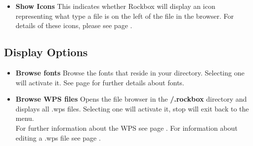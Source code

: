 \begin{itemize}
\begin{itemize}
\item \textbf{Show Icons}
  This indicates whether Rockbox will display an icon representing what type a file is on the left of the file in the browser.  For details of these icons, please see page \pageref{ref:Supportedfileformats}.
\end{itemize}

\subsection{\label{ref:Displayoptions}Display Options}

\begin{itemize}
\item \textbf{Browse fonts}
  Browse the fonts that reside in your  directory. Selecting one will activate it.  See page \pageref{ref:Loadingfonts} for further details about fonts.
  
\item \textbf{Browse WPS files}
  Opens the file browser in the \textbf{/.rockbox} directory and displays all .wps files. Selecting one will activate it, stop will exit back to the menu.\\
  For further information about the WPS see page \pageref{ref:WPS}. For information  about editing a .wps file see page \pageref{ref:ConfiguringtheWPS}.
  

\end{itemize}
\end{itemize}
